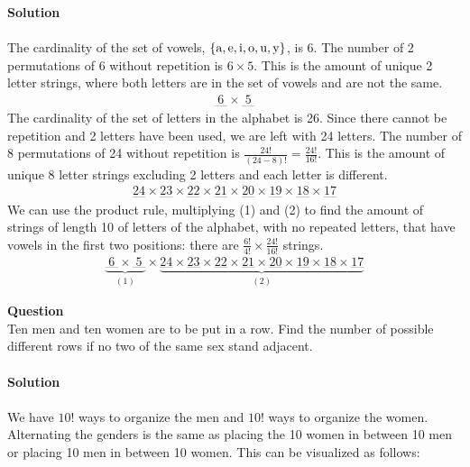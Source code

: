 \documentclass[article,12pt]{article}
\newcounter{question}
\def\questionnum{{\Large\bfseries{Question \arabic{question} }}\\[1em]}
\newcommand{\question}{
    \stepcounter{question}
    \questionnum
}
\newcommand{\solution}{
    {{\large\bfseries{Solution}}}
}
\newcommand{\df}{\displaystyle\frac} %
\DeclarePairedDelimiter\set{\{}{\}}
\begin{document}
\solution \\
\\
The cardinality of the set of vowels, $\set*{\text{a},\text{e},\text{i},\text{o},\text{u},\text{y}}$, is 6. The number of 2 permutations of 6 without repetition is $6 \times 5$. This is the amount of unique 2 letter strings, where both letters are in the set of vowels and are not the same. 
    \begin{align}
        \underset{\text{-----}}{6}\times\underset{\text{{-----}}}{5}
    \end{align}
The cardinality of the set of letters in the alphabet is 26. Since there cannot be repetition and 2 letters have been used, we are left with 24 letters. The number of 8 permutations of 24 without repetition is $\df{24!}{(24-8)!} = \df{24!}{16!}$. This is the amount of unique 8 letter strings excluding 2 letters and each letter is different.
    \begin{align}
        \underset{\text{{-----}}}{24}\times\underset{\text{{-----}}}{23}\times\underset{\text{{-----}}}{22}\times\underset{\text{{-----}}}{21}\times\underset{\text{{-----}}}{20}\times\underset{\text{{-----}}}{19}\times\underset{\text{{-----}}}{18}\times\underset{\text{{-----}}}{17}
    \end{align}
We can use the product rule, multiplying (1) and (2) to find the amount of strings of length 10 of letters of the alphabet, with no repeated letters, that have vowels in the first two positions: there are $\df{6!}{4!} \times \df{24!}{16!}$ strings.
\begin{align*}
    \underbrace{\underset{\text{-----}}{6}\times\underset{\text{{-----}}}{5}}_{(1)}\times\underbrace{\underset{\text{{-----}}}{24}\times\underset{\text{{-----}}}{23}\times\underset{\text{{-----}}}{22}\times\underset{\text{{-----}}}{21}\times\underset{\text{{-----}}}{20}\times\underset{\text{{-----}}}{19}\times\underset{\text{{-----}}}{18}\times\underset{\text{{-----}}}{17}}_{(2)}
\end{align*}
\newpage
\question
Ten men and ten women are to be put in a row. Find the number of possible different  rows if no two of the same sex stand adjacent. \\
\\
\solution \\
\\
We have $10!$ ways to organize the men and $10!$ ways to organize the women. Alternating the genders is the same as placing the 10 women in between 10 men or placing 10 men in between 10 women. This can be visualized as follows:
\end{document}
